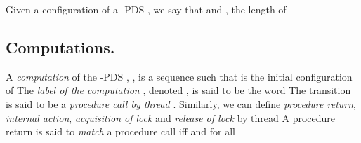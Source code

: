 \documentclass{LMCS}
\begin{document}
\begin{notation}

Given a configuration  of a -PDS ,
we say that 
and , the length of 
\end{notation}

\subsection{Computations.}
 A {\it computation} of  the -PDS , , is a sequence 
 such that  is the initial configuration of
 The {\it label of the computation} {\Comp}, denoted {}, is said to be the word 
The
transition  is said to be a {\it procedure call by thread }. Similarly, we can define {\it procedure return}, {\it internal action},
{\it acquisition of lock } and {\it release of lock } by thread 
A procedure return    is said to
{\it match} a procedure call  iff 
 and for all 
\end{document}
